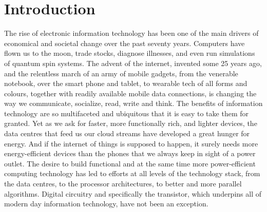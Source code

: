 \chapter{Introduction}

The rise of electronic information technology has been one of the main drivers
of economical and societal change over the past seventy years. Computers have
flown us to the moon, trade stocks, diagnose illnesses, and even run simulations
of quantum spin systems. The advent of the internet, invented some 25 years ago,
and the relentless march of an army of mobile gadgets, from the venerable
notebook, over the smart phone and tablet, to wearable tech of all forms and
colours, together with readily available mobile data connections, is changing
the way we communicate, socialize, read, write and think. The benefits of
information technology are so multifaceted and ubiquitous that it is easy to
take them for granted. Yet as we ask for faster, more functionally rich, and
lighter devices, the data centres that feed us our cloud streams have developed
a great hunger for energy. And if the internet of things is supposed to happen,
it surely needs more energy-efficient devices than the phones that we always
keep in sight of a power outlet. The desire to build functional and at the same
time more power-efficient computing technology has led to efforts at all levels
of the technology stack, from the data centres, to the processor architectures,
to better and more parallel algorithms. Digital circuitry and specifically the
transistor, which underpins all of modern day information technology, have not
been an exception.



